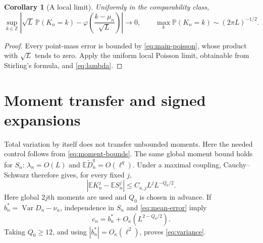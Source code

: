 \documentclass[11pt]{article}
\newcommand{\E}{\mathbb E}
\newcommand{\Pp}{\mathbb P}
\newcommand{\Var}{\operatorname{Var}}
\newtheorem{corollary}[theorem]{Corollary}
\theoremstyle{remark}
\begin{document}
\begin{corollary}[A local limit]\label{cor:local}
Uniformly in the comparability class,
\[
 \sup_{k\in\mathbb Z}\left|\sqrt L\,\Pp(K_n=k)
 -\varphi\left(\frac{k-\mu_n}{\sqrt L}\right)\right|\longrightarrow0,
 \qquad
 \max_k\Pp(K_n=k)\sim(2\pi L)^{-1/2}.
\]
\end{corollary}
\begin{proof}
Every point-mass error is bounded by \eqref{eq:main-poisson}, whose product with $\sqrt L$ tends to zero. Apply the uniform local Poisson limit, obtainable from Stirling's formula, and \eqref{eq:lambda}.
\end{proof}

\section{Moment transfer and signed expansions}\label{sec:signed}
Total variation by itself does not transfer unbounded moments. Here the needed control follows from \eqref{eq:moment-bounds}. The same global moment bound holds for $S_n$: $\lambda_n=O(L)$ and $\E\widetilde D_n^q=O(\ell^q)$. Under a maximal coupling, Cauchy--Schwarz therefore gives, for every fixed $j$,
\begin{equation}\label{eq:moment-transfer}
 |\E K_n^j-\E S_n^j|
 \le C_{\kappa,j}L^jL^{-Q_0/2}.
\end{equation}
Here global $2j$th moments are used and $Q_0$ is chosen in advance.
If $b_n^*=\Var D_n-\nu_n$, independence in $S_n$ and \eqref{eq:mean-error} imply
\begin{equation}\label{eq:variance-transfer}
 c_n=b_n^*+O_\kappa(L^{2-Q_0/2}).
\end{equation}
Taking $Q_0\ge12$, and using $|b_n^*|=O_\kappa(\ell^2)$, proves \eqref{eq:variance}.
\end{document}

